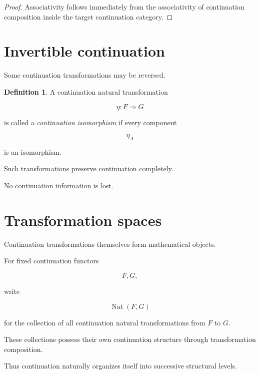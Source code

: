\documentclass[13pt,openany]{book}
\theoremstyle{plain}
\theoremstyle{definition}
\newtheorem{definition}{Definition}[chapter]
\begin{document}
\begin{proof}

Associativity follows immediately from the associativity of continuation
composition inside the target continuation category.

\end{proof}

\section{Invertible continuation}

Some continuation transformations may be reversed.

\begin{definition}

A continuation natural transformation

\[
\eta:F\Longrightarrow G
\]

is called a
\emph{continuation isomorphism}
if every component

\[
\eta_A
\]

is an isomorphism.

\end{definition}

Such transformations preserve continuation completely.

No continuation information is lost.

\section{Transformation spaces}

Continuation transformations themselves form mathematical objects.

For fixed continuation functors

\[
F,G,
\]

write

\[
\operatorname{Nat}(F,G)
\]

for the collection of all continuation natural transformations from \(F\) to
\(G\).

These collections possess their own continuation structure through
transformation composition.

Thus continuation naturally organizes itself into successive structural levels.
\end{document}

